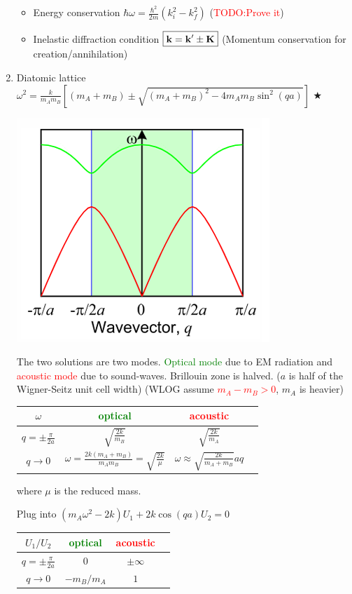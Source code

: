 \documentclass{article}
\theoremstyle{remark}
\theoremstyle{remark}
\newcommand{\where}[1]{\begin{flushright}where #1.\end{flushright}}
\newcommand{\mylabel}[2]{\hyperref[#1]{#2}\label{back:#1}}
\begin{document}
\begin{enumerate}
\begin{itemize}
        \item Energy conservation $\hbar\omega=\frac{\hbar^2}{2m}\left(k_i^2-k_f^2\right)$ (\textcolor{red}{TODO:Prove it})
        \item Inelastic diffraction condition $\boxed{\vb{k}=\vb{k}'\pm\vb{K}}$ (Momentum conservation for creation/annihilation)
    \end{itemize}
    \item Diatomic lattice
        $\omega^2=\frac{k}{m_A m_B}\left[(m_A+m_B)\pm\sqrt{(m_A+m_B)^2-4m_Am_B\sin^2(qa)}\right]$
        \mylabel{thm:diatomic_dispersion}{$\bigstar$}
        \begin{center}
            \includegraphics*[width=0.4\linewidth]{cmp_diatomic_modes.png}
        \end{center}
        The two solutions are two modes. \textcolor{green}{Optical mode} due to EM radiation and \textcolor{red}{acoustic mode} due to sound-waves.
        Brillouin zone is halved. ($a$ is half of the Wigner-Seitz unit cell width)\newline
        (WLOG assume \textcolor{red}{$m_A-m_B>0$}, $m_A$ is heavier)
        \begin{center}
            \begin{tabular}{|Sc|c|c|}
                \hline$\omega$ & \textcolor{green}{optical} & \textcolor{red}{acoustic}\\\hline
                $q=\pm\frac{\pi}{2a}$ & $\sqrt{\frac{2k}{m_B}}$ & $\sqrt{\frac{2k}{m_A}}$\\\hline
                $q\rightarrow0$ & $\omega=\frac{2k(m_A+m_B)}{m_Am_B}=\sqrt{\frac{2k}{\mu}}$ & $\omega\approx\sqrt{\frac{2k}{m_A+m_B}}aq$\\\hline
            \end{tabular}
        \end{center}
        \where{$\mu$ is the reduced mass}
        Plug into $(m_A\omega^2-2k)U_1+2k\cos(qa)U_2 = 0$
        \begin{center}
            \begin{tabular}{|Sc|c|c|}
                \hline$U_1/U_2$ & \textcolor{green}{optical} & \textcolor{red}{acoustic}\\\hline
                $q=\pm\frac{\pi}{2a}$ & 0 & $\pm\infty$\\\hline
                $q\rightarrow0$ & $-m_B/m_A$ & $1$\\\hline
            \end{tabular}
        \end{center}


\end{enumerate}
\end{document}
